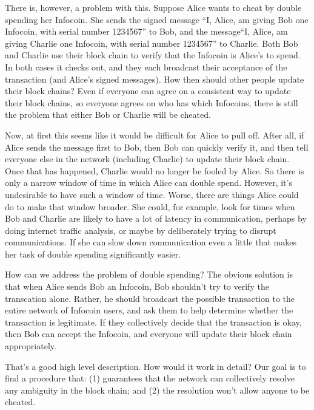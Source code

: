 \documentclass[12pt]{book}
\newcounter{problem}[chapter]
\newcounter{example}[chapter]
\begin{document}
There is, however, a problem with this.  Suppose Alice wants to cheat
by double spending her Infocoin.  She sends the signed message ``I,
Alice, am giving Bob one Infocoin, with serial number 1234567'' to
Bob, and the message``I, Alice, am giving Charlie one Infocoin, with
serial number 1234567'' to Charlie.  Both Bob and Charlie use their
block chain to verify that the Infocoin is Alice's to spend.  In both
cases it checks out, and they each broadcast their acceptance of the
transaction (and Alice's signed messages).  How then should other
people update their block chains?  Even if everyone can agree on a
consistent way to update their block chains, so everyone agrees on who
has which Infocoins, there is still the problem that either Bob or
Charlie will be cheated.

Now, at first this seems like it would be difficult for Alice to pull
off.  After all, if Alice sends the message first to Bob, then Bob can
quickly verify it, and then tell everyone else in the network
(including Charlie) to update their block chain.  Once that has
happened, Charlie would no longer be fooled by Alice. So there is only
a narrow window of time in which Alice can double spend.  However,
it's undesirable to have such a window of time.  Worse, there are
things Alice could do to make that window broader.  She could, for
example, look for times when Bob and Charlie are likely to have a lot
of latency in communication, perhaps by doing internet traffic
analysis, or maybe by deliberately trying to disrupt communications.
If she can slow down communication even a little that makes her task
of double spending significantly easier.

How can we address the problem of double spending?  The obvious
solution is that when Alice sends Bob an Infocoin, Bob shouldn't try
to verify the transcation alone.  Rather, he should broadcast the
possible transaction to the entire network of Infocoin users, and ask
them to help determine whether the transaction is legitimate.  If they
collectively decide that the transaction is okay, then Bob can accept
the Infocoin, and everyone will update their block chain
appropriately.

That's a good high level description.  How would it work in detail?
Our goal is to find a procedure that: (1) guarantees that the network
can collectively resolve any ambiguity in the block chain; and (2) the
resolution won't allow anyone to be cheated.
\end{document}
